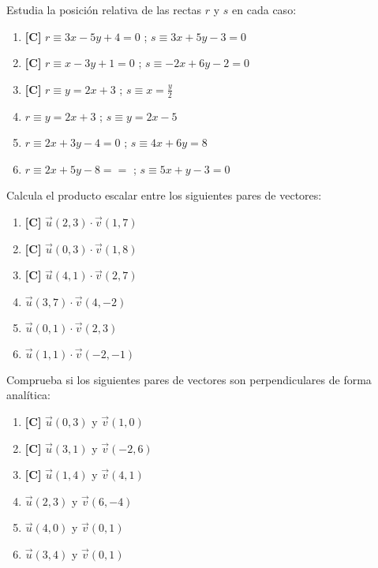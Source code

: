 \Exercicio Estudia la posición relativa de las rectas $r$ y $s$ en cada caso:

\begin{enumerate}[topsep=0pt]
	\item \textbf{[C]} $r \equiv 3x-5y+ 4 = 0 $ ; $s \equiv 3x+ 5y-3 = 0 $
	\item \textbf{[C]} $r \equiv x-3y+ 1 = 0$ ; $s \equiv -2x+ 6y-2 = 0$
	\item \textbf{[C]} $r \equiv y = 2x+ 3$ ; $s \equiv x= \frac{y}{2}$
	
	\item  $r \equiv  y = 2x + 3$ ; $s \equiv y = 2x - 5  $
	\item  $r \equiv 2x + 3y - 4 = 0$ ; $s \equiv 4x +6y = 8$
	\item  $r \equiv 2x + 5y - 8 = =$ ; $s \equiv 5x + y -3 = 0$
\end{enumerate}


\Exercicio Calcula el producto escalar entre los siguientes pares de vectores:

\begin{enumerate}[topsep=0pt]
	\item \textbf{[C]} $ \overrightarrow{u}(2,3) \cdot \overrightarrow{v}(1,7) $
	\item \textbf{[C]} $ \overrightarrow{u}(0,3) \cdot \overrightarrow{v}(1,8) $
	\item \textbf{[C]} $ \overrightarrow{u}(4,1) \cdot \overrightarrow{v}(2,7) $
	
	\item $ \overrightarrow{u}(3,7) \cdot \overrightarrow{v}(4,-2) $
	\item $ \overrightarrow{u}(0,1) \cdot \overrightarrow{v}(2,3) $
	\item $ \overrightarrow{u}(1,1) \cdot \overrightarrow{v}(-2,-1) $
\end{enumerate}


\Exercicio Comprueba si los siguientes pares de vectores son perpendiculares de forma analítica:

\begin{enumerate}[topsep=0pt]
	\item \textbf{[C]} $ \overrightarrow{u}(0,3)$ y $\overrightarrow{v}(1,0) $
	\item \textbf{[C]} $ \overrightarrow{u}(3,1)$ y $\overrightarrow{v}(-2,6) $
	\item \textbf{[C]} $ \overrightarrow{u}(1,4)$ y $\overrightarrow{v}(4,1) $

	\item $ \overrightarrow{u}(2,3)$ y $\overrightarrow{v}(6,-4) $
	\item $ \overrightarrow{u}(4,0)$ y $\overrightarrow{v}(0,1) $
	\item $ \overrightarrow{u}(3,4)$ y $\overrightarrow{v}(0,1) $
\end{enumerate}


